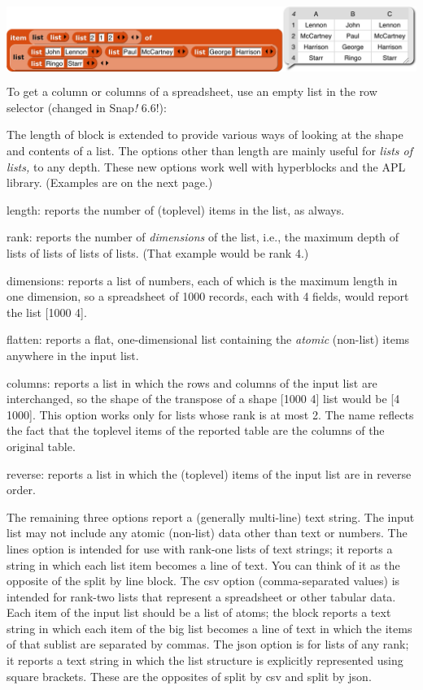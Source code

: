 \includegraphics[width=6.60417in,height=1.04861in]{media/image627.png}To
get a column or columns of a spreadsheet, use an empty list in the row
selector (changed in Snap\emph{!} 6.6!):

The length of block is extended to provide various ways of looking at
the shape and contents of a list. The options other than length are
mainly useful for \emph{lists of lists,} to any depth. These new options
work well with hyperblocks and the APL library. (Examples are on the
next page.)

length: reports the number of (toplevel) items in the list, as always.

rank: reports the number of \emph{dimensions} of the list, i.e., the
maximum depth of lists of lists of lists of lists. (That example would
be rank 4.)

dimensions: reports a list of numbers, each of which is the maximum
length in one dimension, so a spreadsheet of 1000 records, each with 4
fields, would report the list {[}1000 4{]}.

flatten: reports a flat, one-dimensional list containing the
\emph{atomic} (non-list) items anywhere in the input list.

columns: reports a list in which the rows and columns of the input list
are interchanged, so the shape of the transpose of a shape {[}1000 4{]}
list would be {[}4 1000{]}. This option works only for lists whose rank
is at most 2. The name reflects the fact that the toplevel items of the
reported table are the columns of the original table.

reverse: reports a list in which the (toplevel) items of the input list
are in reverse order.

The remaining three options report a (generally multi-line) text string.
The input list may not include any atomic (non-list) data other than
text or numbers. The lines option is intended for use with rank-one
lists of text strings; it reports a string in which each list item
becomes a line of text. You can think of it as the opposite of the split
by line block. The csv option (comma-separated values) is intended for
rank-two lists that represent a spreadsheet or other tabular data. Each
item of the input list should be a list of atoms; the block reports a
text string in which each item of the big list becomes a line of text in
which the items of that sublist are separated by commas. The json option
is for lists of any rank; it reports a text string in which the list
structure is explicitly represented using square brackets. These are the
opposites of split by csv and split by json.

